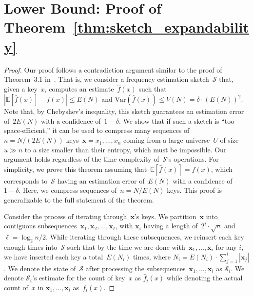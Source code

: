 \documentclass[sigconf]{acmart}
\begin{document}
\section{Lower Bound: Proof of Theorem~\ref{thm:sketch_expandability}}\label{sec:ommitted_proofs_lower}
\thmsketchexpandabilitylabel*
\begin{proof}
    Our proof follows a contradiction argument similar to the proof of
    Theorem~3.1 in~\cite{PaghExpandability}. That is, we consider a frequency
    estimation sketch~$\mathcal{S}$ that, given a key~$x$, computes an
    estimate~$\hat{f}(x)$ such that $|\mathbb{E}[\hat{f}(x)] - f(x)| \leq E(N)$
    and $\mathrm{Var}(\hat{f}(x)) \leq V(N) = \delta \cdot (E(N))^2$. Note
    that, by Chebyshev's inequality, this sketch guarantees an estimation error
    of~$2E(N)$ with a confidence of~$1-\delta$. We show that if such a sketch
    is ``too space-efficient,'' it can be used to compress many sequences
    of~$n=N/(2E(N))$ keys~$\mathbf{x}=x_1,\dots,x_n$ coming from a large
    universe~$U$ of size~$u \gg n$ to a size smaller than their entropy, which
    must be impossible. Our argument holds regardless of the time complexity
    of~$\mathcal{S}$'s operations. For simplicity, we prove this theorem
    assuming that~$\mathbb{E}[\hat{f}(x)]=f(x)$, which corresponds
    to~$\mathcal{S}$ having an estimation error of~$E(N)$ with a confidence
    of~$1-\delta$. Here, we compress sequences of~$n=N/E(N)$ keys. This proof
    is generalizable to the full statement of the theorem.

    Consider the process of iterating through~$\mathbf{x}$'s keys. We
    partition~$\mathbf{x}$ into contiguous subsequences~$\mathbf{x}_1,
    \mathbf{x}_2, \dots, \mathbf{x}_\ell$, with $\mathbf{x}_i$ having a length
    of~$2^i \cdot \sqrt{n}$ and $\ell=\log_2 n/2$. While iterating through
    these subsequences, we reinsert each key enough times into~$\mathcal{S}$
    such that by the time we are done with~$\mathbf{x}_1,\dots,\mathbf{x}_i$
    for any $i$, we have inserted each key a total~$E(N_i)$ times, where
    $N_i=E(N_i) \cdot \sum_{j=1}^i |\mathbf{x}_j|$. We denote the state
    of~$\mathcal{S}$ after processing the subsequences~$\mathbf{x}_1, \dots,
    \mathbf{x}_i$ as $\mathcal{S}_i$. We denote $\mathcal{S}_i$'s estimate for
    the count of key~$x$ as $\hat{f}_i(x)$ while denoting the actual count
    of~$x$ in $\mathbf{x}_1, \dots, \mathbf{x}_i$ as~$f_i(x)$. 


\end{proof}
\end{document}

